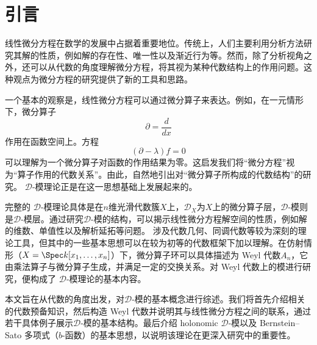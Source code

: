 \section{引言}

线性微分方程在数学的发展中占据着重要地位。传统上，人们主要利用分析方法研究其解的性质，例如解的存在性、唯一性以及渐近行为等。然而，除了分析视角之外，还可以从代数的角度理解微分方程，将其视为某种代数结构上的作用问题。这种观点为微分方程的研究提供了新的工具和思路。

一个基本的观察是，线性微分方程可以通过微分算子来表达。例如，在一元情形下，微分算子
\[
    \partial = \frac{d}{dx}
\]
作用在函数空间上。方程
\[
    (\partial - \lambda)f = 0
\]
可以理解为一个微分算子对函数的作用结果为零。这启发我们将“微分方程”视为“算子作用的代数关系”。由此，自然地引出对“微分算子所构成的代数结构”的研究。
$\mathcal{D}$-模理论正是在这一思想基础上发展起来的。



完整的 $\mathcal{D}$-模理论具体是在$n$维光滑代数簇$X$上，$\mathcal{D}_X$为$X$上的微分算子层，$\mathcal{D}$-模则是$\mathcal{D}$-模层。通过研究$\mathcal{D}$-模的结构，可以揭示线性微分方程解空间的性质，例如解的维数、单值性以及解析延拓等问题。
涉及代数几何、同调代数等较为深刻的理论工具，但其中的一些基本思想可以在较为初等的代数框架下加以理解。在仿射情形（$X=\Spec k[x_1,\ldots,x_n]$）下，微分算子环可以具体描述为 Weyl 代数$A_n$，它由乘法算子与微分算子生成，并满足一定的交换关系。对 Weyl 代数上的模进行研究，便构成了 $\mathcal{D}$-模理论的基本内容。

本文旨在从代数的角度出发，对$\mathcal{D}$-模的基本概念进行综述。我们将首先介绍相关的代数预备知识，然后构造 Weyl 代数并说明其与线性微分方程之间的联系，通过若干具体例子展示$\mathcal{D}$-模的基本结构。最后介绍 holonomic $\mathcal{D}$-模以及 Bernstein–Sato 多项式（$b$-函数）的基本思想，以说明该理论在更深入研究中的重要性。


